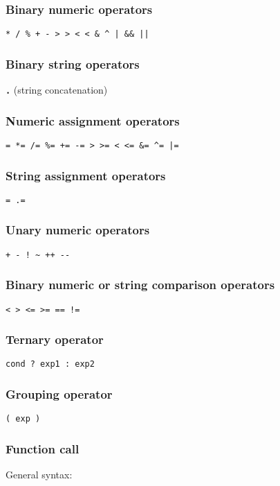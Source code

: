 \documentclass[twoside,english]{article}
\begin{document}
\subsubsection{Binary numeric operators}
\texttt{{*} / \% + - >\,{}> <\,{}< \& \textasciicircum{}
| \&\& ||}


\subsubsection{Binary string operators}
\texttt{\textbf{.}} (string concatenation)


\subsubsection{Numeric assignment operators}
\texttt{= {*}= /= \%= += -= >\,{}>= <\,{}<=
\&= \textasciicircum{}= |=}


\subsubsection{String assignment operators}

\texttt{= .=}


\subsubsection{Unary numeric operators}
\texttt{+ - ! \textasciitilde{} ++ -{}-}


\subsubsection{Binary numeric or string comparison operators}
\texttt{< > <= >= == !=}


\subsubsection{Ternary operator\label{sub:Ternary-operator}}
\texttt{cond ? exp1 : exp2}


\subsubsection{Grouping operator}
\texttt{( exp )}


\subsubsection{Function call}
General syntax:
\end{document}
